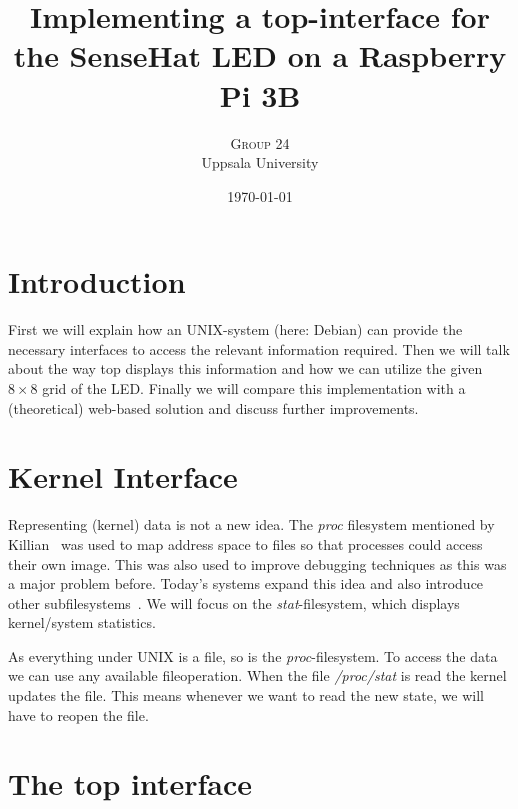 \documentclass[twoside,twocolumn]{article}
\title{Implementing a top-interface for the SenseHat LED on a Raspberry Pi 3B} %
\author{%
\textsc{Group 24} \\[1ex] %
\normalsize Uppsala University \\ %
}
\date{\today} %
\begin{document}
\maketitle


\section{Introduction}

First we will explain how an UNIX-system (here: Debian) can provide the 
necessary interfaces to access the relevant information required. Then we will 
talk about the way top displays this information and how we can utilize the 
given $8\times8$ grid of the LED\@. Finally we will compare this implementation
with a (theoretical) web-based solution and discuss further improvements. 


\section{Kernel Interface}

Representing (kernel) data is not a new idea. The \textit{proc} filesystem 
mentioned by Killian~\cite{Killian:1984} was used to map address space to files 
so that processes could access their own image. This was also used to improve 
debugging techniques as this was a major problem before. Today's systems expand 
this idea and also introduce other subfilesystems~\cite{proc(5)}. We will focus 
on the \textit{stat}-filesystem, which displays kernel/system statistics.

As everything under UNIX is a file, so is the \textit{proc}-filesystem. To
access the data we can use any available fileoperation. When the file
\textit{/proc/stat} is read the kernel updates the file. This means whenever we
want to read the new state, we will have to reopen the file.



\section{The top interface}
\end{document}
